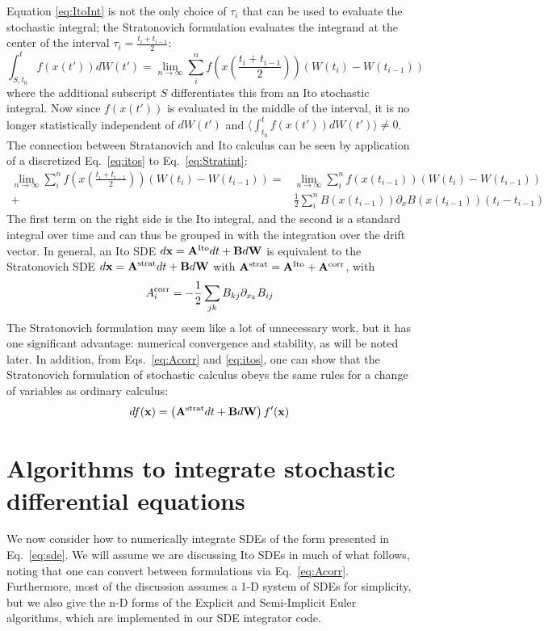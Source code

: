\documentclass[onecolumn,notitlepage,pra,10pt,aps]{revtex4-1}
\newcommand {\be}{\begin{equation}}
\newcommand {\ee}{\end{equation}}
\newcommand{\expect}[1]{\langle#1\rangle}
\begin{document}
Equation \eqref{eq:ItoInt} is not the only choice of $\tau_i$ that can be used to evaluate the stochastic integral; the Stratonovich formulation evaluates the integrand at the center of the interval $\tau_i=\frac{t_i+t_{i-1}}{2}$:
\be
\int_{S,t_0}^t f(x(t'))dW(t')=\lim_{n\to\infty} \sum_i^n f(x(\frac{t_i+t_{i-1}}{2}))\left(W(t_i)-W(t_{i-1})\right) \label{eq:Stratint}
\ee
where the additional subscript $S$ differentiates this from an Ito stochastic integral. Now since $f(x(t'))$  is evaluated in the middle of the interval, it is no longer statistically independent of  $dW(t')$ and $\expect{\int_{t_0}^t f(x(t'))dW(t')}\neq0$. The connection between Stratanovich and Ito calculus can be seen by application of a discretized Eq.~\eqref{eq:itos} to Eq.~\eqref{eq:Stratint}:
\begin{align}
\lim_{n\to\infty} \sum_i^n f(x(\frac{t_i+t_{i-1}}{2}))\left(W(t_i)-W(t_{i-1})\right)=& \lim_{n\to\infty} \sum_i^n f(x(t_{i-1}))\left(W(t_i)-W(t_{i-1})\right) \nonumber \\
+&\frac{1}{2}\sum_i^n B(x(t_{i-1}))\partial_x B(x(t_{i-1}))(t_i-t_{i-1})\nonumber
\end{align}
The first term on the right side is the Ito integral, and the second is a standard integral over time and can thus be  grouped in with the integration over the drift vector.  In general, an Ito SDE $d\mathbf{x}=\mathbf{A}^{\rm Ito}dt+\mathbf{B}d\mathbf{W}$ is equivalent to the Stratonovich SDE $d\mathbf{x}=\mathbf{A}^{\rm strat}dt+\mathbf{B}d\mathbf{W}$ with $\mathbf{A}^{\rm strat}=\mathbf{A}^{\rm Ito}+\mathbf{A}^{\rm corr}$, with 
\be
{A}^{\rm corr}_i=-\frac{1}{2}\sum_{jk}B_{kj}\partial_{x_k}B_{ij}
\label{eq:Acorr}
\ee
 The Stratonovich formulation may seem like a lot of unnecessary work, but it has one significant advantage: numerical convergence and stability, as will be noted later.  In addition, from Eqs.~\eqref{eq:Acorr} and \eqref{eq:itos}, one can show that the Stratonovich formulation of stochastic calculus obeys the same rules for a change of variables as ordinary calculus:
\be
df(\mathbf{x})=\left(\mathbf{A}^{\rm strat}dt+\mathbf{B}d\mathbf{W}\right)f'(\mathbf{x})
\ee
\section{Algorithms to integrate stochastic differential equations}
We now consider how to numerically integrate SDEs of the form presented in Eq.~\eqref{eq:sde}.  We will assume we are discussing Ito SDEs in much of what follows, noting that one can convert between formulations via Eq.~\eqref{eq:Acorr}.  Furthermore, most of the discussion assumes a 1-D system of SDEs for simplicity, but we also give the n-D forms of the Explicit and Semi-Implicit Euler algorithms, which are implemented in our SDE integrator code.
\end{document}
